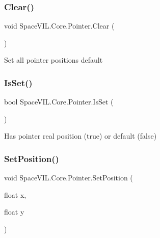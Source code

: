 \subsubsection{\texorpdfstring{Clear()}{Clear()}}
{\footnotesize\ttfamily void Space\+V\+I\+L.\+Core.\+Pointer.\+Clear (\begin{DoxyParamCaption}{ }\end{DoxyParamCaption})}



Set all pointer positions default 

\mbox{\label{class_space_v_i_l_1_1_core_1_1_pointer_ab5a11690e60618f05b32ce065e3e9b30}} 
\subsubsection{\texorpdfstring{Is\+Set()}{IsSet()}}
{\footnotesize\ttfamily bool Space\+V\+I\+L.\+Core.\+Pointer.\+Is\+Set (\begin{DoxyParamCaption}{ }\end{DoxyParamCaption})}



Has pointer real position (true) or default (false) 

\mbox{\label{class_space_v_i_l_1_1_core_1_1_pointer_a8bb785976ab94d33b3db4698513fa608}} 
\subsubsection{\texorpdfstring{Set\+Position()}{SetPosition()}\hspace{0.1cm}{\footnotesize\ttfamily [1/2]}}
{\footnotesize\ttfamily void Space\+V\+I\+L.\+Core.\+Pointer.\+Set\+Position (\begin{DoxyParamCaption}\item[{float}]{x,  }\item[{float}]{y }\end{DoxyParamCaption})}



